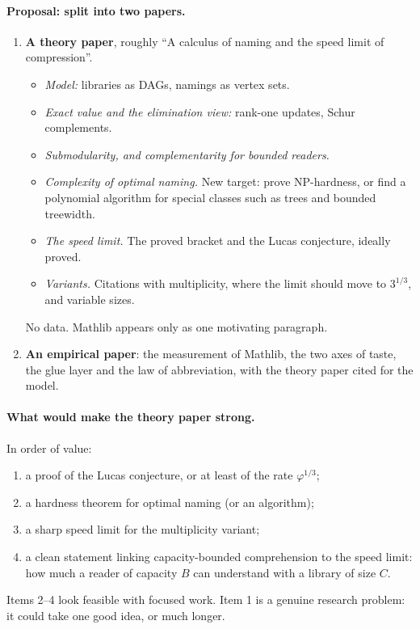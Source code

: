 \documentclass[11pt]{article}
\begin{document}
\paragraph{Proposal: split into two papers.}
\begin{enumerate}
\item \textbf{A theory paper}, roughly ``A calculus of naming and the speed limit of
  compression''.
  \begin{itemize}
  \item \emph{Model:} libraries as DAGs, namings as vertex sets.
  \item \emph{Exact value and the elimination view:} rank-one updates, Schur complements.
  \item \emph{Submodularity, and complementarity for bounded readers.}
  \item \emph{Complexity of optimal naming.} New target: prove NP-hardness, or find a
    polynomial algorithm for special classes such as trees and bounded treewidth.
  \item \emph{The speed limit.} The proved bracket and the Lucas conjecture, ideally
    proved.
  \item \emph{Variants.} Citations with multiplicity, where the limit should move to
    $3^{1/3}$, and variable sizes.
  \end{itemize}
  No data. Mathlib appears only as one motivating paragraph.
\item \textbf{An empirical paper}: the measurement of Mathlib, the two axes of taste, the
  glue layer and the law of abbreviation, with the theory paper cited for the model.
\end{enumerate}

\paragraph{What would make the theory paper strong.} In order of value:
\begin{enumerate}
\item a proof of the Lucas conjecture, or at least of the rate $\varphi^{1/3}$;
\item a hardness theorem for optimal naming (or an algorithm);
\item a sharp speed limit for the multiplicity variant;
\item a clean statement linking capacity-bounded comprehension to the speed limit: how
  much a reader of capacity $B$ can understand with a library of size $C$.
\end{enumerate}
Items 2--4 look feasible with focused work. Item 1 is a genuine research problem: it
could take one good idea, or much longer.
\end{document}
